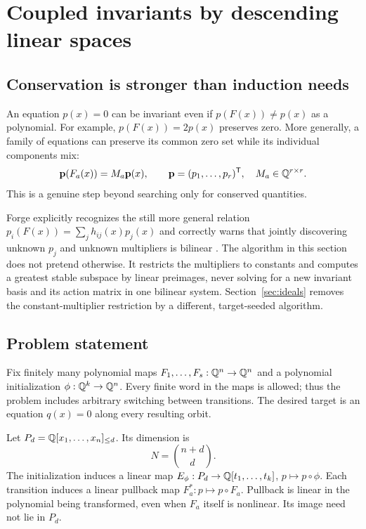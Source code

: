 \section{Coupled invariants by descending linear spaces}
\label{sec:spaces}

\subsection{Conservation is stronger than induction needs}

An equation $p(x)=0$ can be invariant even if $p(F(x))\ne p(x)$ as a polynomial.
For example, $p(F(x))=2p(x)$ preserves zero. More generally, a family of equations
can preserve its common zero set while its individual components mix:
\begin{equation}\label{eq:matrix-action}
 \mathbf p(F_a(x))=M_a\mathbf p(x),\qquad
 \mathbf p=(p_1,\ldots,p_r)^{\mathsf T},\quad M_a\in\mathbb{Q}^{r\times r}.
\end{equation}
This is a genuine step beyond searching only for conserved quantities.

Forge explicitly recognizes the still more general relation
$p_i(F(x))=\sum_j h_{ij}(x)p_j(x)$ and correctly warns that jointly discovering
unknown $p_j$ and unknown multipliers is bilinear \cite{forge-structural}.
The algorithm in this section does not pretend otherwise. It restricts the
multipliers to constants and computes a greatest stable subspace by linear
preimages, never solving for a new invariant basis and its action matrix in one
bilinear system. Section~\ref{sec:ideals} removes the constant-multiplier
restriction by a different, target-seeded algorithm.

\subsection{Problem statement}

Fix finitely many polynomial maps
$F_1,\ldots,F_s:\mathbb{Q}^n\to\mathbb{Q}^n$ and a polynomial initialization
$\phi:\mathbb{Q}^k\to\mathbb{Q}^n$. Every finite word in the maps is allowed; thus the problem
includes arbitrary switching between transitions. The desired target is an
equation $q(x)=0$ along every resulting orbit.

Let $P_d=\mathbb{Q}[x_1,\ldots,x_n]_{\le d}$. Its dimension is
\[
 N=\binom{n+d}{d}.
\]
The initialization induces a linear map
$E_\phi:P_d\to\mathbb{Q}[t_1,\ldots,t_k]$, $p\mapsto p\circ\phi$.
Each transition induces a linear pullback map $F_a^*:p\mapsto p\circ F_a$.
Pullback is linear in the polynomial being transformed, even when $F_a$ itself
is nonlinear. Its image need not lie in $P_d$.

